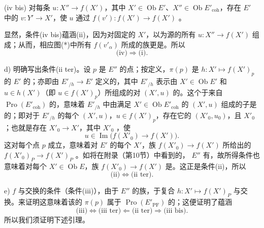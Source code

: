 (iv bis) 对每条 $u:X''\to f(X')$，其中 $X'\in\operatorname{Ob}E'$、$X''\in\operatorname{Ob}E'_{\mathrm{coh}}$，存在 $E'$ 中的 $v:Y'\to X'$，使 $u$ 通过 $f(v'):f(X')\to f(X')$ 。

显然，条件(iv bis)蕴涵(ii)，因为对固定的 $X'$，以为源的所有 $u:X''\to f(X')$ 组成；从而，相应图(*)中所有 $f(v'_\alpha)$ 所成的族更是。所以
\[
\text{(iv)}\Rightarrow\text{(i)}.
\]

d) 明确写出条件(ii ter)。设 $p$ 是 $E''$ 的点；按定义，$\pi(p)$ 是 $h:X'\mapsto f(X')_p$ 的 $E'$ 的；亦即由 $E'_{/h}\to E'$ 定义的，其中 $E'_{/h}$ 表示由 $X'\in\operatorname{Ob}E'$ 和 $u\in h(X')$（即 $u\in f(X')_p$）所组成的对 $(X',u)$ 的。这个于来自 $\operatorname{Pro}(E'_{\mathrm{coh}})$ 的，意味着 $E'_{/h}$ 中由满足 $X'\in\operatorname{Ob}E'_{\mathrm{coh}}$ 的 $(X',u)$ 组成的子是的；即对于 $E'_{/h}$ 的每个 $(X',u)$，$u\in f(X')_p$，存在它的 $(X'_0,u_0)$，且 $X'_0$ ；也就是存在 $X'_0\to X'$，其中 $X'_0$ ，使
\[
u\in\operatorname{Im}\bigl(f(X'_0)\longrightarrow f(X')\bigr).
\]
这对每个点 $p$ 成立，意味着对 $E'$ 的每个 $X'$，族 $f(X'_0)\to f(X')$ 所给出的 $f(X'_0)_P\to f(X')_P$ 。如将在附录（第10节）中看到的， $E''$ 有，故所得条件也意味着对每个 $X'\in\operatorname{Ob}E$，族 $f(X'_0)\to f(X')$ 是。这正是条件(ii)，所以
\[
\text{(ii)}\Longleftrightarrow\text{(ii ter)}.
\]

e) $f$ 与交换的条件（条件(iii)），由于 $E''$ 的族，于复合 $h:X'\mapsto f(X')_P$ 与交换。来证明这意味着该的 $\pi(p)$ 属于 $\operatorname{Pro}(E'_{\mathrm{PF}})$ 的；这便证明了蕴涵
\[
\text{(iii)}\Leftrightarrow\text{(iii ter)}\Leftarrow\text{(ii ter)}\Rightarrow\text{(iii bis)}.
\]
所以我们须证明下述引理。


